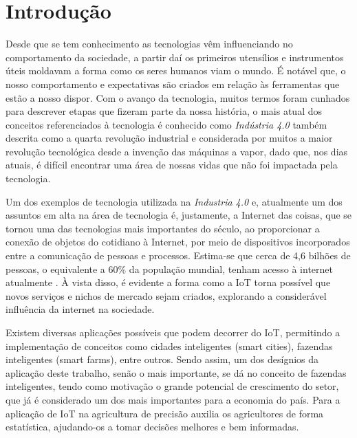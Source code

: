 \documentclass[tcc,capa]{texufpel}
\begin{document}
\tableofcontents

\chapter{Introdução}

Desde que se tem conhecimento as tecnologias vêm influenciando no comportamento da sociedade, a partir daí os primeiros utensílios e instrumentos úteis moldavam a forma como os seres humanos viam o mundo. É notável que, o nosso comportamento e expectativas são criados em relação às ferramentas que estão a nosso dispor. Com o avanço da tecnologia, muitos termos foram cunhados para descrever etapas que fizeram parte da nossa história, o mais atual dos conceitos referenciados à tecnologia é conhecido como \textit{Indústria 4.0} também descrita como a quarta revolução industrial e considerada por muitos a maior revolução tecnológica desde a invenção das máquinas a vapor, dado que, nos dias atuais, é difícil encontrar uma área de nossas vidas que não foi impactada pela tecnologia.

Um dos exemplos de tecnologia utilizada na \textit{Industria 4.0} e, atualmente um dos assuntos em alta na área de tecnologia é, justamente, a Internet das coisas, que se tornou uma das tecnologias mais importantes do século,
ao proporcionar a conexão de objetos do cotidiano à Internet, por meio de dispositivos
incorporados entre a comunicação de pessoas e processos. Estima-se que cerca de 4,6 bilhões de pessoas, o equivalente a 60\% da população mundial, tenham acesso à internet atualmente \cite{bancomundial:2022}. À vista disso, é evidente a forma como a IoT torna possível que novos serviços e nichos de mercado sejam criados, explorando a considerável influência da internet na sociedade.

Existem diversas aplicações possíveis que podem decorrer do IoT, permitindo a implementação de conceitos como cidades inteligentes (smart cities), fazendas inteligentes (smart farms), entre outros. Sendo assim, um dos desígnios da aplicação deste trabalho, senão o mais importante, se dá no conceito de fazendas inteligentes, tendo como motivação o grande potencial de crescimento do setor, que já é considerado um dos mais importantes para a economia do país. Para \citet{MUANGPRATHUB:2019} a aplicação de IoT na agricultura de precisão auxilia os agricultores de forma estatística, ajudando-os a tomar decisões melhores e bem informadas.
\end{document}
